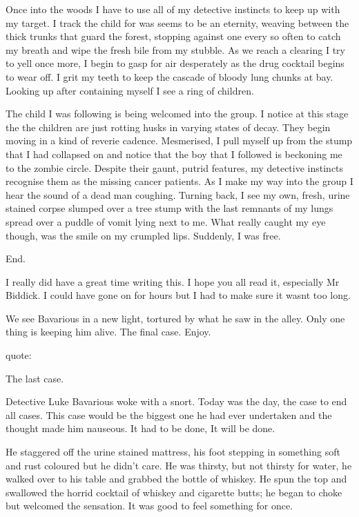 Once into the woods I have to use all of my detective instincts to
keep up with my target. I track the child for was seems to be an
eternity, weaving between the thick trunks that guard the forest,
stopping against one every so often to catch my breath and wipe the
fresh bile from my stubble. As we reach a clearing I try to yell
once more, I begin to gasp for air desperately as the drug cocktail
begins to wear off. I grit my teeth to keep the cascade of bloody
lung chunks at bay. Looking up after containing myself I see a ring
of children.

The child I was following is being welcomed into the group. I
notice at this stage the the children are just rotting husks in
varying states of decay. They begin moving in a kind of reverie
cadence. Mesmerised, I pull myself up from the stump that I had
collapsed on and notice that the boy that I followed is beckoning
me to the zombie circle. Despite their gaunt, putrid features, my
detective instincts recognise them as the missing cancer patients.
As I make my way into the group I hear the sound of a dead man
coughing. Turning back, I see my own, fresh, urine stained corpse
slumped over a tree stump with the last remnants of my lungs spread
over a puddle of vomit lying next to me. What really caught my eye
though, was the smile on my crumpled lips. Suddenly, I was
free.



End. 
 





I really did have a great time writing this. I hope you all read
it, especially Mr Biddick. I could have gone on for hours but I had
to make sure it wasnt too long.



We see Bavarious in a new light, tortured by what he saw in the
alley. Only one thing is keeping him alive. The final case.
Enjoy.




quote:


The last case.



Detective Luke Bavarious woke with a snort. Today was the day, the
case to end all cases. This case would be the biggest one he had
ever undertaken and the thought made him nauseous. It had to be
done, It will be done.



He staggered off the urine stained mattress, his foot stepping in
something soft and rust coloured but he didn't care. He was
thirsty, but not thirsty for water, he walked over to his table and
grabbed the bottle of whiskey. He spun the top and swallowed the
horrid cocktail of whiskey and cigarette butts; he began to choke
but welcomed the sensation. It was good to feel something for
once.



